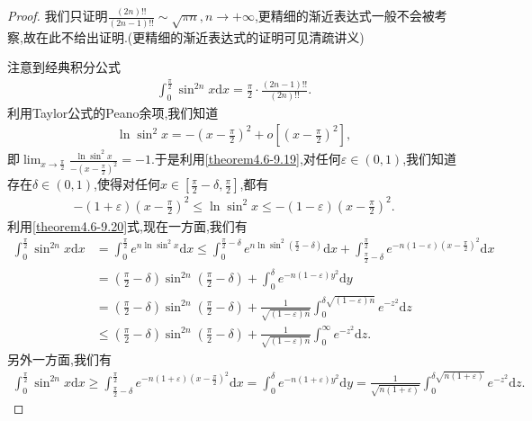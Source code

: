 \documentclass[../../main.tex]{subfiles}%
\begin{document}
\begin{proof}

我们只证明$\frac{(2n)!!}{(2n-1)!!}\sim \sqrt{\pi n},n\rightarrow +\infty$,更精细的渐近表达式一般不会被考察,故在此不给出证明.(更精细的渐近表达式的证明可见清疏讲义)

注意到经典积分公式
\begin{align}\label{theorem4.6-1.1}
\int_{0}^{\frac{\pi}{2}}\sin^{2n}x \mathrm{d}x=\frac{\pi}{2}\cdot\frac{(2n - 1)!!}{(2n)!!}.
\end{align}
利用Taylor公式的Peano余项,我们知道
\begin{align}\label{theorem4.6-9.19}
\ln\sin^{2}x=-\left(x - \frac{\pi}{2}\right)^{2}+o\left[\left(x - \frac{\pi}{2}\right)^{2}\right],
\end{align}
即\(\lim_{x\rightarrow \frac{\pi}{2}}\frac{\ln\sin^{2}x}{-(x - \frac{\pi}{2})^{2}}=-1\).于是利用\eqref{theorem4.6-9.19},对任何\(\varepsilon\in(0,1)\),我们知道存在\(\delta\in(0,1)\),使得对任何\(x\in[\frac{\pi}{2}-\delta,\frac{\pi}{2}]\),都有
\begin{align}\label{theorem4.6-9.20}
-(1 + \varepsilon)\left(x - \frac{\pi}{2}\right)^{2}\leqslant\ln\sin^{2}x\leqslant-(1 - \varepsilon)\left(x - \frac{\pi}{2}\right)^{2}.
\end{align}
利用\eqref{theorem4.6-9.20}式,现在一方面,我们有
\begin{align*}
\int_{0}^{\frac{\pi}{2}}\sin^{2n}x \mathrm{d}x&=\int_{0}^{\frac{\pi}{2}}e^{n\ln\sin^{2}x}\mathrm{d}x
\leqslant\int_{0}^{\frac{\pi}{2}-\delta}e^{n\ln\sin^{2}(\frac{\pi}{2}-\delta)}\mathrm{d}x+\int_{\frac{\pi}{2}-\delta}^{\frac{\pi}{2}}e^{-n(1 - \varepsilon)(x - \frac{\pi}{2})^{2}}\mathrm{d}x\\
&=(\frac{\pi}{2}-\delta)\sin^{2n}(\frac{\pi}{2}-\delta)+\int_{0}^{\delta}e^{-n(1 - \varepsilon)y^{2}}\mathrm{d}y\\
&=(\frac{\pi}{2}-\delta)\sin^{2n}(\frac{\pi}{2}-\delta)+\frac{1}{\sqrt{(1 - \varepsilon)n}}\int_{0}^{\delta\sqrt{(1 - \varepsilon)n}}e^{-z^{2}}\mathrm{d}z\\
&\leqslant(\frac{\pi}{2}-\delta)\sin^{2n}(\frac{\pi}{2}-\delta)+\frac{1}{\sqrt{(1 - \varepsilon)n}}\int_{0}^{\infty}e^{-z^{2}}\mathrm{d}z.
\end{align*}
另外一方面,我们有
\begin{align*}
\int_{0}^{\frac{\pi}{2}}\sin^{2n}x \mathrm{d}x\geqslant\int_{\frac{\pi}{2}-\delta}^{\frac{\pi}{2}}e^{-n(1 + \varepsilon)(x - \frac{\pi}{2})^{2}}\mathrm{d}x
=\int_{0}^{\delta}e^{-n(1 + \varepsilon)y^{2}}\mathrm{d}y
=\frac{1}{\sqrt{n(1 + \varepsilon)}}\int_{0}^{\delta\sqrt{n(1 + \varepsilon)}}e^{-z^{2}}\mathrm{d}z.

\end{align*}
\end{proof}
\end{document}
